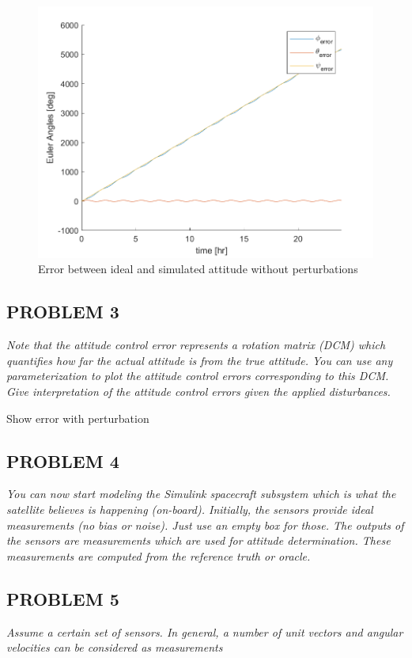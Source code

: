 \begin{figure}
    \centering
    \includegraphics{Images/ps6_problem2.png}
    \caption{Error between ideal and simulated attitude without perturbations}
    \label{fig:Images/ps6_problem2.png}
\end{figure}

\subsection{PROBLEM 3}
\textit{Note that the attitude control error represents a rotation matrix (DCM) which quantifies how far the actual attitude is from the true attitude. You can use any parameterization to plot the attitude control errors corresponding to this DCM. Give interpretation of the attitude control errors given the applied disturbances.}

Show error with perturbation

\subsection{PROBLEM 4}
\textit{You can now start modeling the Simulink spacecraft subsystem which is what the satellite believes is happening (on-board). Initially, the sensors provide ideal measurements (no bias or noise). Just use an empty box for those. The outputs of the sensors are measurements which are used for attitude determination. These measurements are computed from the reference truth or oracle.}

\subsection{PROBLEM 5}
\textit{Assume a certain set of sensors. In general, a number of unit vectors and angular velocities can be considered as measurements}

